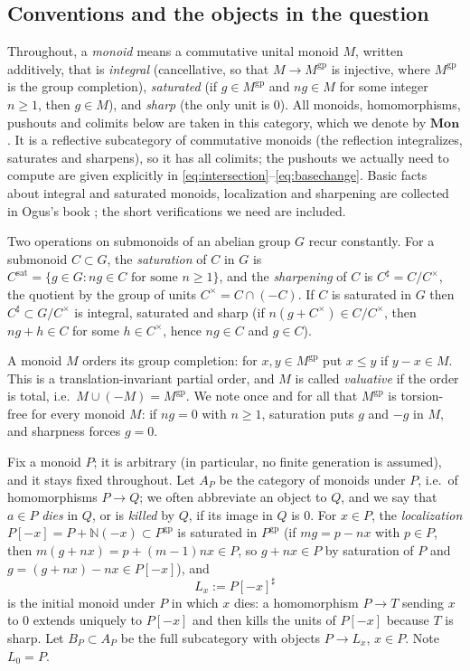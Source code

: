 \documentclass[11pt]{article}
\newcommand{\N}{\mathbb N}
\newcommand{\gp}{\mathrm{gp}}
\newcommand{\sat}{\mathrm{sat}}
\theoremstyle{definition}
\theoremstyle{remark}
\begin{document}
\subsection{Conventions and the objects in the question}
\label{sec:conventions}

Throughout, a \emph{monoid} means a commutative unital monoid \(M\), written
additively, that is
\emph{integral} (cancellative, so that \(M\to M^{\gp}\) is injective, where
\(M^{\gp}\) is the group completion),
\emph{saturated} (if \(g\in M^{\gp}\) and \(ng\in M\) for some integer
\(n\ge1\), then \(g\in M\)), and
\emph{sharp} (the only unit is \(0\)).
All monoids, homomorphisms, pushouts and colimits below are taken in this
category, which we denote by \(\mathbf{Mon}\).  It is a reflective
subcategory of commutative monoids (the reflection integralizes, saturates
and sharpens), so it has all colimits; the pushouts we actually need to
compute are given explicitly in
\eqref{eq:intersection}--\eqref{eq:basechange}.  Basic facts about
integral and saturated monoids, localization and sharpening are collected in
Ogus's book \cite[Ch.~I, \S\S1.3--1.4]{ogus}; the short verifications we need
are included.

Two operations on submonoids of an abelian group \(G\) recur constantly.
For a submonoid \(C\subset G\), the \emph{saturation} of \(C\) in \(G\) is
\(C^{\sat}=\{g\in G:ng\in C\text{ for some }n\ge1\}\),
and the \emph{sharpening} of \(C\) is \(C^\sharp=C/C^\times\), the quotient by
the group of units \(C^\times=C\cap(-C)\).  If \(C\) is saturated in \(G\)
then \(C^\sharp\subset G/C^\times\) is integral, saturated and sharp
(if \(n(g+C^\times)\in C/C^\times\), then \(ng+h\in C\) for some
\(h\in C^\times\), hence \(ng\in C\) and \(g\in C\)).

A monoid \(M\) orders its group completion: for \(x,y\in M^{\gp}\) put
\(x\le y\) if \(y-x\in M\).  This is a translation-invariant partial order,
and \(M\) is called \emph{valuative} if the order is total, i.e.\
\(M\cup(-M)=M^{\gp}\).  We note once and for all that \(M^{\gp}\) is
torsion-free for every monoid \(M\): if \(ng=0\) with \(n\ge1\), saturation
puts \(g\) and \(-g\) in \(M\), and sharpness forces \(g=0\).

Fix a monoid \(P\); it is arbitrary (in particular, no finite generation
is assumed), and it stays fixed throughout.  Let \(A_P\) be the category of
monoids under \(P\),
i.e.\ of homomorphisms \(P\to Q\); we often abbreviate an object to \(Q\),
and we say that \(a\in P\) \emph{dies} in \(Q\), or is \emph{killed} by
\(Q\), if its image in \(Q\) is \(0\).
For \(x\in P\), the \emph{localization} \(P[-x]=P+\N(-x)\subset P^{\gp}\) is
saturated in \(P^{\gp}\) (if \(mg=p-nx\) with \(p\in P\), then
\(m(g+nx)=p+(m-1)nx\in P\), so \(g+nx\in P\) by saturation of \(P\) and
\(g=(g+nx)-nx\in P[-x]\)), and
\[
   L_x:=P[-x]^\sharp
\]
is the initial monoid under \(P\) in which \(x\) dies: a homomorphism
\(P\to T\) sending \(x\) to \(0\) extends uniquely to \(P[-x]\) and then
kills the units of \(P[-x]\) because \(T\) is sharp.  Let \(B_P\subset A_P\)
be the full subcategory with objects \(P\to L_x\), \(x\in P\).  Note
\(L_0=P\).
\end{document}

